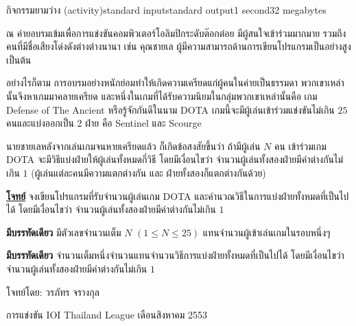 \documentclass[11pt,a4paper]{article}
\begin{document}
\begin{problem}{กิจกรรมยามว่าง (activity)}{standard input}{standard output}{1 second}{32 megabytes}

ณ ค่ายอบรมเข้มเพื่อการแข่งขันคอมพิวเตอร์โอลิมปิกระดับต๊อกต๋อย มีผู้สนใจเข้าร่วมมากมาย รวมถึงคนที่มีชื่อเสียงโด่งดังต่างต่างนานา เช่น คุณชายเล ผู้มีความสามารถด้านการเขียนโปรแกรมเป็นอย่างสูง เป็นต้น

อย่างไรก็ตาม การอบรมอย่างหนักย่อมทำให้เกิดความเครียดแก่ผู้คนในค่ายเป็นธรรมดา พวกเขาเหล่านั้นจึงหาเกมมาคลายเครียด และหนึ่งในเกมที่ได้รับความนิยมในกลุ่มพวกเขาเหล่านั้นคือ เกม Defense of The Ancient หรือรู้จักกันดีในนาม DOTA เกมนี้จะมีผู้เล่นเข้าร่วมแข่งขันไม่เกิน $25$ คนและแบ่งออกเป็น $2$ ฝ่าย คือ Sentinel และ Scourge

นายชายเลหลังจากเล่นเกมจนหายเครียดแล้ว ก็เกิดข้อสงสัยขึ้นว่า ถ้ามีผู้เล่น $N$ คน เข้าร่วมเกม DOTA จะมีวิธีแบ่งฝ่ายให้ผู้เล่นทั้งหมดกี่วิธี โดยมีเงื่อนไขว่า จำนวนผู้เล่นทั้งสองฝ่ายมีค่าต่างกันไม่เกิน $1$ (ผู้เล่นแต่ละคนมีความแตกต่างกัน และ ฝ่ายทั้งสองก็แตกต่างกันด้วย)

\underline{\textbf{โจทย์}} จงเขียนโปรแกรมที่รับจำนวนผู้เล่นเกม DOTA และคำนวณวิธีในการแบ่งฝ่ายทั้งหมดที่เป็นไปได้ โดยมีเงื่อนไขว่า จำนวนผู้เล่นทั้งสองฝ่ายมีค่าต่างกันไม่เกิน $1$

\InputFile

\textbf{มีบรรทัดเดียว} มีตัวเลขจำนวนเต็ม $N$ $(1 \leq N \leq 25)$ แทนจำนวนผู้เข้าเล่นเกมในรอบหนึ่งๆ

\OutputFile

\textbf{มีบรรทัดเดียว} จำนวนเต็มหนึ่งจำนวนแทนจำนวนวิธีการแบ่งฝ่ายทั้งหมดที่เป็นไปได้ โดยมีเงื่อนไขว่า จำนวนผู้เล่นทั้งสองฝ่ายมีค่าต่างกันไม่เกิน $1$


\Examples

\begin{example}
%
%
%
\end{example}

\Source

โจทย์โดย: วรภัทร จรางกุล

การแข่งขัน IOI Thailand League เดือนสิงหาคม 2553

\end{problem}
\end{document}
